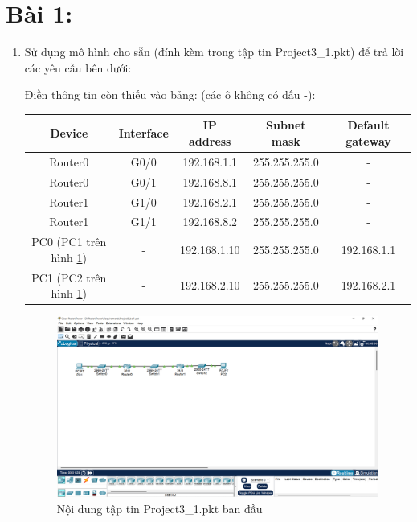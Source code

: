 \section{Bài 1:}
\begin{enumerate}
\bf
\item Sử dụng mô hình cho sẵn (đính kèm trong tập tin Project3{\_}1.pkt) để trả lời các yêu cầu bên dưới:

\rm Điền thông tin còn thiếu vào bảng: (các ô không có dấu -):
\begin{center}
\begin{tabular}{|c|c|c|c|c|}
\hline
\textbf{Device}&\textbf{Interface}&\textbf{IP address}&\textbf{Subnet mask}&\textbf{Default gateway}\\
\hline
Router0&G0/0&192.168.1.1&255.255.255.0&-\\
\hline
Router0&G0/1&192.168.8.1&255.255.255.0&-\\
\hline
Router1&G1/0&192.168.2.1&255.255.255.0&-\\
\hline
Router1&G1/1&192.168.8.2&255.255.255.0&-\\
\hline
PC0 (PC1 trên hình \ref{fig1.1})&-&192.168.1.10&255.255.255.0&192.168.1.1\\
\hline
PC1 (PC2 trên hình \ref{fig1.1})&-&192.168.2.10&255.255.255.0&192.168.2.1\\
\hline
\end{tabular}
\end{center}
\begin{figure}[H]
\begin{center}
\includegraphics[scale=0.4]{../figures/p1/p1-prob}
\end{center}
\caption{Nội dung tập tin Project3{\_}1.pkt ban đầu}
\label{fig1.1}
\end{figure}


\end{enumerate}

